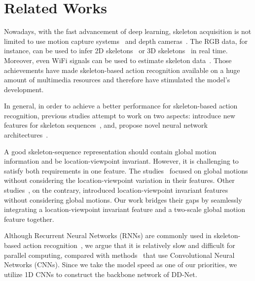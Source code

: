 \documentclass[journal]{IEEEtran}
\begin{document}
\section{Related Works}

Nowadays, with the fast advancement of deep learning, skeleton acquisition is not limited to use motion capture systems~\cite{moeslund2001survey} and depth cameras~\cite{zhang2012microsoft}. The RGB data, for instance, can be used to infer 2D skeletons~\cite{cao2017realtime,xiao2018simple} or 3D skeletons~\cite{VNect_SIGGRAPH2017,ge2018real} in real time. Moreover, even WiFi signals can be used to estimate skeleton data~\cite{zhao2018through,wang2019can}. Those achievements have made skeleton-based action recognition available on a huge amount of multimedia resources and therefore have stimulated the model's development.

In general, in order to achieve a better performance for skeleton-based action recognition, previous studies attempt to work on two aspects: introduce new features for skeleton sequences~\cite{chen2011learning,de2016skeleton,liu2017enhanced,caputo20173,zhang2018fusing,choutas2018potion,chen2019mfa}, and, propose novel neural network architectures~\cite{Li2017Joint, lee2017ensemble, tang2018deep, yang2018action, devineau2018convolutional,hou2018spatial, ludl2019simple}. 

A good skeleton-sequence representation should contain global motion information and be location-viewpoint invariant. However, it is challenging to satisfy both requirements in one feature. The studies~\cite{de2016skeleton,caputo20173, choutas2018potion,chen2019mfa} focused on global motions without considering the location-viewpoint variation in their features. Other studies~\cite{chen2011learning,liu2017enhanced,zhang2018fusing}, on the contrary, introduced location-viewpoint invariant features without considering global motions. Our work bridges their gaps by seamlessly integrating a location-viewpoint invariant feature and a two-scale global motion feature together.    

Although Recurrent Neural Networks (RNNs) are commonly used in skeleton-based action recognition~\cite{du2015hierarchical,liu2016spatio,wang2017modeling, song2017end, li2017skeleton, zhang2018fusing}, we argue that it is relatively slow and difficult for parallel computing, compared with methods~\cite{Li2017Joint,devineau2018convolutional,chen2019mfa} that use Convolutional Neural Networks (CNNs). Since we take the model speed as one of our priorities, we utilize 1D CNNs to construct the backbone network of DD-Net.
\end{document}
